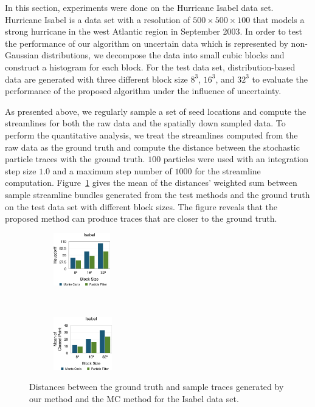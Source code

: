 In this section, experiments were done on the Hurricane Isabel data set. Hurricane Isabel is a data set with a resolution of $500 \times 500 \times 100$ that models a strong hurricane in the west Atlantic region in September 2003. In order to test the performance of our algorithm on uncertain data which is represented by non-Gaussian distributions, we decompose the data into small cubic blocks and construct a histogram for each block. For the test data set, distribution-based data are generated with three different block size $8^3$, $16^3$, and $32^3$ to evaluate the performance of the proposed algorithm under the influence of uncertainty.

As presented above, we regularly sample a set of seed locations and compute the streamlines for both the raw data and the spatially down sampled data. To perform the quantitative analysis, we treat the streamlines computed from the raw data as the ground truth and compute the distance between the stochastic particle traces with the ground truth. $100$ particles were used with an integration step size $1.0$ and a maximum step number of $1000$ for the streamline computation. Figure~\ref{berror_r} gives the mean of the distances' weighted sum between sample streamline bundles generated from the test methods and the ground truth on the test data set with different block sizes. The figure reveals that the proposed method can produce traces that are closer to the ground truth.

\begin{figure}[!htb]
  \centering
  \begin{subfigure}[b]{0.24\textwidth}
    \centering
    \includegraphics[height=0.9in]{../figures/isabel_h.eps}
  \end{subfigure}~
  \begin{subfigure}[b]{0.24\textwidth}
    \centering
    \includegraphics[height=0.9in]{../figures/isabel_m.eps}
  \end{subfigure}
  \caption{Distances between the ground truth and sample traces generated by our method and the MC method for the Isabel data set.}
  \label{berror_r}
\end{figure}

